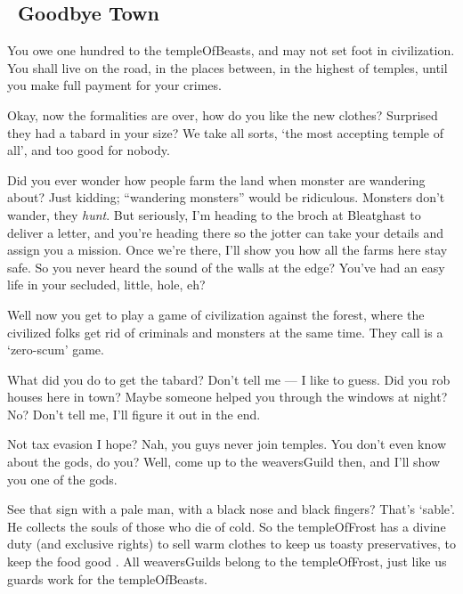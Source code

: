 \subsection*{~Goodbye Town}
\itshape

\begin{speechtext}
  \raggedright
  You owe one hundred  to the \gls{templeOfBeasts}, and may not set foot in civilization.
  You shall live on the road, in the places between, in the highest of \glspl{temple}, until you make full payment for your crimes.
\end{speechtext}

Okay, now the formalities are over, how do you like the new clothes?
Surprised they had a tabard in your size?
We take all sorts, `the most accepting \gls{temple} of all', and too good for nobody.

Did you ever wonder how people farm the land when monster are wandering about?
Just kidding; ``wandering monsters'' would be ridiculous.
Monsters don't wander, they \emph{hunt}.
But seriously, I'm heading to the \gls{broch} at Bleatghast to deliver a letter, 
and you're heading there so the \gls{jotter} can take your details and assign you a mission.
Once we're there, I'll show you how all the farms here stay safe.
So you never heard the sound of the walls at the \gls{edge}?
You've had an easy life in your secluded, little, hole, eh?

Well now you get to play a game of civilization against the forest, where the civilized folks get rid of criminals and \glspl{monster} at the same time.
They call is a `zero-scum' game.

What did you do to get the tabard?
Don't tell me --- I like to guess.
Did you rob houses here in town?
Maybe someone helped you through the windows at night?
No?
Don't tell me, I'll figure it out in the end.

Not tax evasion I hope?
Nah, you guys never join \glspl{temple}.
You don't even know about the gods, do you?
Well, come up to the \gls{weaversGuild} then, and I'll show you one of the gods.

See that sign with a pale man, with a black nose and black fingers?
That's `\gls{sable}'.
He collects the souls of those who die of cold.
So the \gls{templeOfFrost} has a divine duty (and exclusive rights) to sell
\ifnum{}%
  warm clothes to keep us toasty%
\else%
  preservatives, to keep the food good%
\fi.
All \glspl{weaversGuild} belong to the \gls{templeOfFrost}, just like us \glspl{guard} work for the \gls{templeOfBeasts}.

